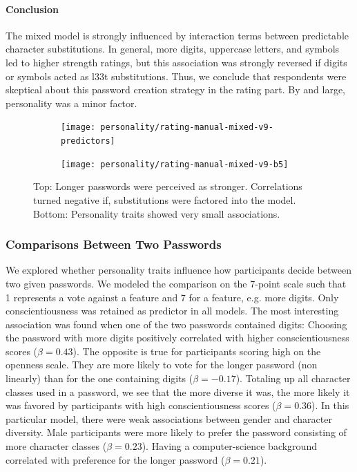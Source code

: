 \paragraph{Conclusion} The mixed model is strongly influenced by interaction terms between predictable character substitutions. In general, more digits, uppercase letters, and symbols led to higher strength ratings, but this association was strongly reversed if digits or symbols acted as l33t substitutions. Thus, we conclude that respondents were skeptical about this password creation strategy in the rating part. By and large, personality was a minor factor.


\begin{figure}[htbp]
	\centering
	\begin{subfigure}[t]{\linewidth}
		\texttt{[image: personality/rating-manual-mixed-v9-predictors]}
	\end{subfigure}
	\begin{subfigure}[b]{\linewidth}
	\texttt{[image: personality/rating-manual-mixed-v9-b5]}
	\end{subfigure}
	\caption{\label{fig:personality:study2:rating-mixed-model} Top: Longer passwords were perceived as stronger. Correlations turned negative if, substitutions were factored into the model. Bottom: Personality traits showed very small associations.}
\end{figure}

\subsubsection{Comparisons Between Two Passwords}

We explored whether personality traits influence how participants decide between two given passwords. We modeled the comparison on the 7-point scale such that 1 represents a vote against a feature and 7 for a feature, e.g. more digits. Only conscientiousness was retained as predictor in all models. The most interesting association was found when one of the two passwords contained digits: Choosing the password with more digits positively correlated with higher conscientiousness scores ($\beta = 0.43$). The opposite is true for participants scoring high on the openness scale. They are more likely to vote for the longer password (non linearly) than for the one containing digits ($\beta = -0.17$). Totaling up all character classes used in a password, we see that the more diverse it was, the more likely it was favored by participants with high conscientiousness scores ($\beta = 0.36$). 
In this particular model, there were weak associations between gender and character diversity. Male participants were more likely to prefer the password consisting of more character classes ($\beta = 0.23$). Having a computer-science background correlated with preference for the longer password ($\beta = 0.21$).

